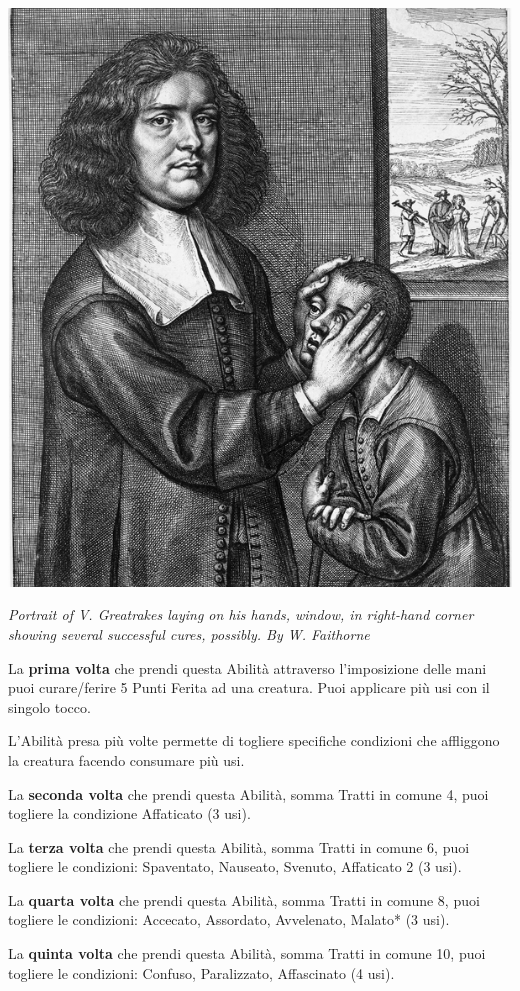 \begin{multicols}{2}
\begin{center}
	\includegraphics[width=0.75\linewidth]{immagini/Portrait_of_V_Greatrakesv2.png}

	\emph{Portrait of V. Greatrakes laying on his hands, window, in right-hand corner showing several successful cures, possibly. By W. Faithorne }
\end{center}

\medskip

La \textbf{prima volta} che prendi questa Abilità attraverso l'imposizione delle mani puoi curare/ferire 5 Punti Ferita ad una creatura. Puoi applicare più usi con il singolo tocco.

L'Abilità presa più volte permette di togliere specifiche condizioni che affliggono la creatura facendo consumare più usi.

La \textbf{seconda volta} che prendi questa Abilità, somma Tratti in comune 4, puoi togliere la condizione Affaticato (3 usi).

La \textbf{terza volta} che prendi questa Abilità, somma Tratti in comune 6, puoi togliere le condizioni: Spaventato, Nauseato, Svenuto, Affaticato 2 (3 usi).

La \textbf{quarta volta} che prendi questa Abilità, somma Tratti in comune 8, puoi togliere le condizioni: Accecato, Assordato, Avvelenato, Malato* (3 usi).

La \textbf{quinta volta} che prendi questa Abilità, somma Tratti in comune 10, puoi togliere le condizioni: Confuso, Paralizzato, Affascinato (4 usi).


\end{multicols}
